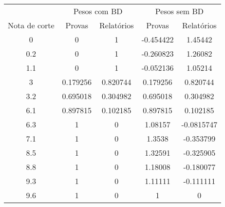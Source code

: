 \begin{tabular}{c cccc}
        \hline
                      & \multicolumn{2}{c}{Pesos com BD}
                      & \multicolumn{2}{c}{Pesos sem BD} \\ \cline{2-5}
        Nota de corte & Provas & Relatórios & Provas & Relatórios \\
        \hline
        0    & 0        & 1        & -0.454422 & 1.45442    \\
        0.2  & 0        & 1        & -0.260823 & 1.26082    \\
        1.1  & 0        & 1        & -0.052136 & 1.05214    \\
        3    & 0.179256 & 0.820744 & 0.179256  & 0.820744   \\
        3.2  & 0.695018 & 0.304982 & 0.695018  & 0.304982   \\
        6.1  & 0.897815 & 0.102185 & 0.897815  & 0.102185   \\
        6.3  & 1        & 0        & 1.08157   & -0.0815747 \\
        7.1  & 1        & 0        & 1.3538    & -0.353799  \\
        8.5  & 1        & 0        & 1.32591   & -0.325905  \\
        8.8  & 1        & 0        & 1.18008   & -0.180077  \\
        9.3  & 1        & 0        & 1.11111   & -0.111111  \\
        9.6  & 1        & 0        & 1         & 0          \\
        \hline
\end{tabular}
